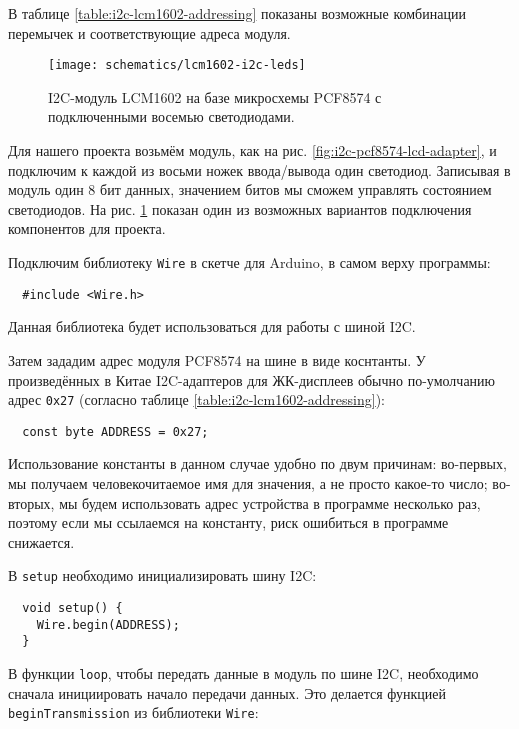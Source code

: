 \documentclass[../sparc.tex]{subfiles}
\begin{document}
В таблице \ref{table:i2c-lcm1602-addressing} показаны возможные комбинации
перемычек и соответствующие адреса модуля.

\begin{figure}[H]
  \centering
  \texttt{[image: schematics/lcm1602-i2c-leds]}
  \caption{I2C-модуль LCM1602 на базе микросхемы PCF8574 с подключенными восемью
    светодиодами.}
  \label{fig:lcm1602-i2c-leds}
\end{figure}

Для нашего проекта возьмём модуль, как на
рис. \ref{fig:i2c-pcf8574-lcd-adapter}, и подключим к каждой из восьми ножек
ввода/вывода один светодиод.  Записывая в модуль один 8 бит данных, значением
битов мы сможем управлять состоянием светодиодов.  На
рис. \ref{fig:lcm1602-i2c-leds} показан один из возможных вариантов подключения
компонентов для проекта.

Подключим библиотеку \texttt{Wire} в скетче для Arduino, в самом верху
программы:

\begin{verbatim}
  #include <Wire.h>
\end{verbatim}

Данная библиотека будет использоваться для работы с шиной I2C.

Затем зададим адрес модуля PCF8574 на шине в виде коснтанты.  У произведённых в
Китае I2C-адаптеров для ЖК-дисплеев обычно по-умолчанию адрес \texttt{0x27}
(согласно таблице \ref{table:i2c-lcm1602-addressing}):

\begin{verbatim}
  const byte ADDRESS = 0x27;
\end{verbatim}

Использование константы в данном случае удобно по двум причинам: во-первых, мы
получаем человекочитаемое имя для значения, а не просто какое-то число;
во-вторых, мы будем использовать адрес устройства в программе несколько раз,
поэтому если мы ссылаемся на константу, риск ошибиться в программе снижается.

В \texttt{setup} необходимо инициализировать шину I2C:

\begin{verbatim}
  void setup() {
    Wire.begin(ADDRESS);
  }
\end{verbatim}

В функции \texttt{loop}, чтобы передать данные в модуль по шине I2C, необходимо
сначала инициировать начало передачи данных.  Это делается функцией
\texttt{beginTransmission} из библиотеки \texttt{Wire}:
\end{document}
